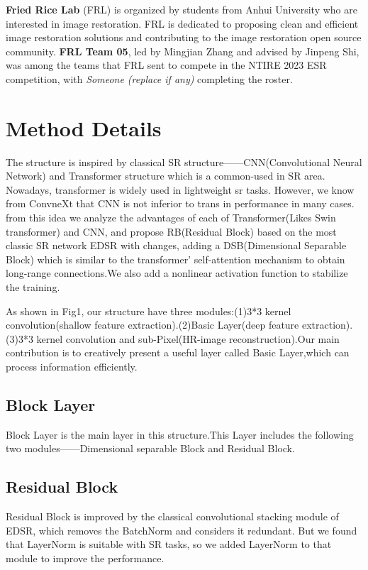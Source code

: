 \documentclass[10pt,twocolumn,letterpaper]{article}
\begin{document}
\textbf{Fried Rice Lab} (FRL) is organized by students from Anhui University who are interested in image restoration. FRL is dedicated to proposing clean and efficient image restoration solutions and contributing to the image restoration open source community. \textbf{FRL Team 05}, led by Mingjian Zhang and advised by Jinpeng Shi, was among the teams that FRL sent to compete in the NTIRE 2023 ESR competition, with \textit{Someone (replace if any)} completing the roster.

\section{Method Details}

The structure is inspired by classical SR structure——CNN(Convolutional Neural Network) and Transformer structure which is a common-used in SR area.
Nowadays, transformer is widely used in lightweight sr tasks. However, we know from ConvneXt\cite{ref1} that CNN is not inferior to trans in performance in many cases. from this idea we analyze the advantages of each of Transformer(Likes Swin transformer\cite{ref2}) and CNN, and propose RB(Residual Block) based on the most classic SR network EDSR\cite{ref3} with changes, adding a DSB(Dimensional Separable Block) which is similar to the transformer' self-attention mechanism to obtain long-range connections.We also add a nonlinear activation function to stabilize the training.

As shown in Fig1, our structure have three modules:(1)3*3 kernel convolution(shallow feature extraction).(2)Basic Layer(deep feature extraction).(3)3*3 kernel convolution and sub-Pixel(HR-image reconstruction).Our main contribution is to creatively present a useful layer called Basic Layer,which can process information efficiently.

\subsection{Block Layer}
Block Layer is the main layer in this structure.This Layer includes the following two modules——Dimensional separable Block and Residual Block.

\subsection{Residual Block}
Residual Block is improved by the classical convolutional stacking module of EDSR, which removes the BatchNorm and considers it redundant. But we found that LayerNorm\cite{ref4} is suitable with SR tasks, so we added LayerNorm to that module to improve the performance.
\end{document}
